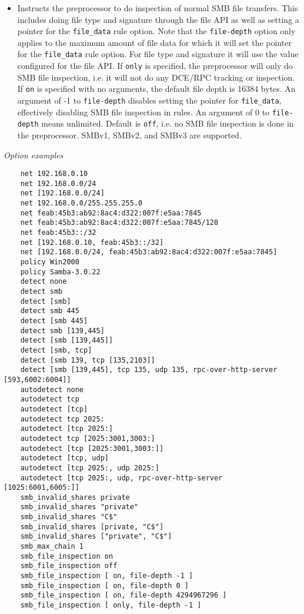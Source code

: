 \documentclass[english]{report}
\begin{document}
\begin{itemize}
\begin{itemize}
\item[] Instructs the preprocessor to do inspection of normal SMB file
transfers.  This includes doing file type and signature through
the file API as well as setting a pointer for the \texttt{file\_data}
rule option.  Note that the \texttt{file-depth} option only applies to the
maximum amount of file data for which it will set the pointer for the
\texttt{file\_data} rule option.  For file type and signature it will use the
value configured for the file API.  If \texttt{only} is specified, the
preprocessor will only do SMB file inspection, i.e. it will not do any DCE/RPC
tracking or inspection.  If \texttt{on} is specified with no
arguments, the default file depth is 16384 bytes.  An argument of -1 to
\texttt{file-depth} disables setting the pointer for \texttt{file\_data}, effectively
disabling SMB file inspection in rules.  An argument of 0 to
\texttt{file-depth} means unlimited.  Default is \texttt{off}, i.e. no SMB file
inspection is done in the preprocessor. SMBv1, SMBv2, and SMBv3 are
 supported.


\end{itemize}

\end{itemize}

\textit{Option examples}
\footnotesize
\begin{verbatim}
    net 192.168.0.10
    net 192.168.0.0/24
    net [192.168.0.0/24]
    net 192.168.0.0/255.255.255.0
    net feab:45b3:ab92:8ac4:d322:007f:e5aa:7845
    net feab:45b3:ab92:8ac4:d322:007f:e5aa:7845/128
    net feab:45b3::/32
    net [192.168.0.10, feab:45b3::/32]
    net [192.168.0.0/24, feab:45b3:ab92:8ac4:d322:007f:e5aa:7845]
    policy Win2000
    policy Samba-3.0.22
    detect none
    detect smb
    detect [smb]
    detect smb 445
    detect [smb 445]
    detect smb [139,445]
    detect [smb [139,445]]
    detect [smb, tcp]
    detect [smb 139, tcp [135,2103]]
    detect [smb [139,445], tcp 135, udp 135, rpc-over-http-server [593,6002:6004]]
    autodetect none
    autodetect tcp
    autodetect [tcp]
    autodetect tcp 2025:
    autodetect [tcp 2025:]
    autodetect tcp [2025:3001,3003:]
    autodetect [tcp [2025:3001,3003:]]
    autodetect [tcp, udp]
    autodetect [tcp 2025:, udp 2025:]
    autodetect [tcp 2025:, udp, rpc-over-http-server [1025:6001,6005:]]
    smb_invalid_shares private
    smb_invalid_shares "private"
    smb_invalid_shares "C$"
    smb_invalid_shares [private, "C$"]
    smb_invalid_shares ["private", "C$"]
    smb_max_chain 1
    smb_file_inspection on
    smb_file_inspection off
    smb_file_inspection [ on, file-depth -1 ]
    smb_file_inspection [ on, file-depth 0 ]
    smb_file_inspection [ on, file-depth 4294967296 ]
    smb_file_inspection [ only, file-depth -1 ]
\end{verbatim}
\normalsize
\end{document}
